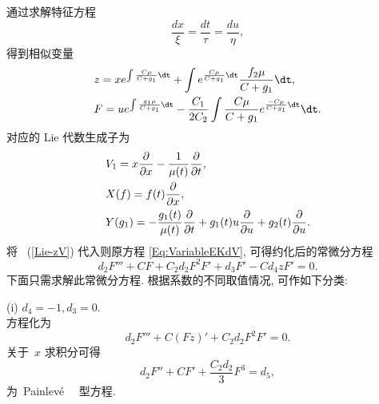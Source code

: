 %
通过求解特征方程
\begin{equation}
\frac{d x}{\xi}=\frac{d t}{\tau}=\frac{d u}{\eta},
\end{equation}
得到相似变量
\begin{align}\label{Lie-zV}
&z=x e^{\int\frac{C\mu}{C+g_1}\dt}+\int e^{\frac{C\mu}{C+g_1}\dt}\frac{f_2\mu}{C+g_1}\dt,\notag\\
&F=u e^{\int\frac{g_1\mu}{C+g_1}\dt}-\frac{C_1}{2C_2}\int\frac{C\mu}{C+g_1}e^{\frac{-C\mu}{C+g_1}\dt}\dt.
\end{align}
对应的 Lie 代数生成子为
\begin{align}\label{Lie-algebra}
&V_1=x\frac{\partial}{\partial x}-\frac{1}{\mu(t)}\frac{\partial}{\partial t},\notag\\
&X(f)=f(t)\frac{\partial}{\partial x},\notag\\
&Y(g_1)=-\frac{g_1(t)}{\mu(t)}\frac{\partial}{\partial t}+g_1(t)u\frac{\partial}{\partial u}+g_2(t)\frac{\partial}{\partial u}.
\end{align}
将~ (\ref{Lie-zV}) 代入则原方程 \eqref{Eq:VariableEKdV}, 可得约化后的常微分方程
\begin{equation}
d_2 F'''+C F+C_2 d_2 F^2F'+d_3 F'-C d_4 zF'=0.
\end{equation}
下面只需求解此常微分方程. 根据系数的不同取值情况, 可作如下分类:

(i) $d_4=-1, d_3=0$.\\
方程化为
\begin{equation}
d_2 F'''+C (Fz)'+C_2d_2 F^2F'=0.
\end{equation}
关于~$x$ 求积分可得
\begin{equation}
d_2 F''+C F'+\frac{C_2d_2}{3}F^3=d_5,
\end{equation}
为~Painlev\'{e}\ ~\uppercase\expandafter{} 型方程.

